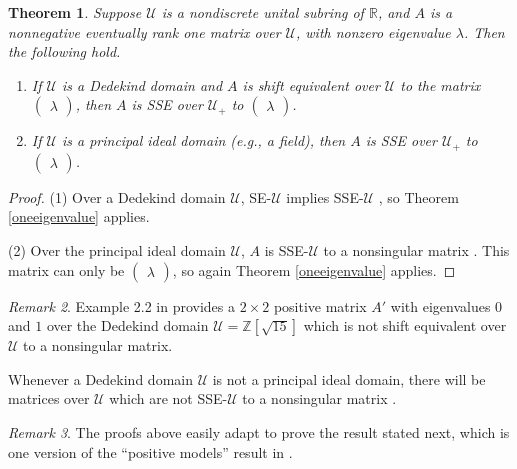 \documentclass{amsart}
\newtheorem{theorem}{Theorem}[section]
\theoremstyle{definition}
\theoremstyle{remark}
\newtheorem{remark}[theorem]{Remark}
\numberwithin{equation}{section}
\begin{document}
{{\begin{theorem} \label{dedekindtheorem}
Suppose 
$\mathcal U$ is a nondiscrete unital subring of $\mathbb R$, 
 and $A$ is a nonnegative 
eventually rank one matrix over $\mathcal U$, with nonzero 
eigenvalue $\lambda$. Then the following hold. 
\begin{enumerate} 
\item 
If 
$\mathcal U$ is a Dedekind domain and $A$ is shift equivalent 
over $\mathcal U$ 
to the matrix $\begin{pmatrix}\lambda\end{pmatrix}$, then 
$A$ is SSE over $\mathcal U_+$ to $\begin{pmatrix}\lambda\end{pmatrix}$. 
\item 
If $\mathcal U$ is a principal ideal domain (e.g., 
a field), then $A$ is SSE over $\mathcal U_+$ to 
$\begin{pmatrix}\lambda\end{pmatrix}$. 
\end{enumerate} 
\end{theorem} 

\begin{proof} 
(1) Over a Dedekind domain $\mathcal U$, SE-$\mathcal U$ implies 
SSE-$\mathcal U$ \cite[Prop. 2.4]{BH2}, 
so Theorem \ref{oneeigenvalue} applies. 

(2) Over the principal ideal domain $\mathcal U$, 
$A$ is SSE-$\mathcal U$ to a nonsingular matrix 
\cite{E,Wi2}. 
This matrix can only be 
$\begin{pmatrix}\lambda\end{pmatrix}$, 
so again  
Theorem \ref{oneeigenvalue} applies. 
\end{proof} 

\begin{remark} \label{dedekindremark}
Example 2.2  in \cite{BH2} provides a
$2\times 2$ positive matrix 
$A'$ with eigenvalues $0$ and $1$ over the 
Dedekind domain $\mathcal U=\mathbb Z[\sqrt{15}]$ 
which is not shift equivalent over $\mathcal U$ 
 to a nonsingular matrix. 

Whenever a 
Dedekind domain $\mathcal U$  
is not a principal ideal domain, there will be matrices 
over $\mathcal U$ which are not SSE-$\mathcal U$ to 
a nonsingular matrix \cite{BH2}.
\end{remark}




\begin{remark} The proofs above 
easily adapt to prove the result stated next, 
which is one version of the  ``positive models'' result 
 in \cite{KR4}. 
\end{remark} 

}}
\end{document}
